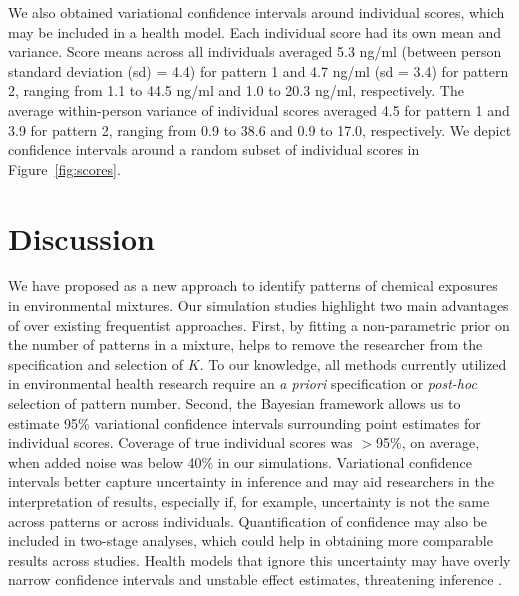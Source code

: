 We also obtained variational confidence intervals around individual scores, which may be included in a health model. Each individual score had its own mean and variance. Score means across all individuals averaged 5.3 ng/ml (between person standard deviation (sd) = 4.4) for pattern 1 and 4.7 ng/ml (sd = 3.4) for pattern 2, ranging from 1.1 to 44.5 ng/ml and 1.0 to 20.3 ng/ml, respectively. The average within-person variance of individual scores averaged 4.5 for pattern 1 and 3.9 for pattern 2, ranging from 0.9 to 38.6 and 0.9 to 17.0, respectively. We depict confidence intervals around a random subset of individual scores in Figure~\ref{fig:scores}.

\section{Discussion}

We have proposed \bnmf as a new approach to identify patterns of chemical exposures in environmental mixtures. Our simulation studies highlight two main advantages of \bnmf over existing frequentist approaches. First, by fitting a non-parametric prior on the number of patterns in a mixture, \bnmf helps to remove the researcher from the specification and selection of $K$. To our knowledge, all methods currently utilized in environmental health research require an \textit{a priori} specification or \textit{post-hoc} selection of pattern number. Second, the Bayesian framework allows us to estimate 95\% variational confidence intervals surrounding point estimates for individual scores. Coverage of true individual scores was $>$95\%, on average, when added noise was below 40\% in our simulations. Variational confidence intervals better capture uncertainty in inference and may aid researchers in the interpretation of results, especially if, for example, uncertainty is not the same across patterns or across individuals. Quantification of confidence may also be included in two-stage analyses, which could help in obtaining more comparable results across studies. Health models that ignore this uncertainty may have overly narrow confidence intervals and unstable effect estimates, threatening inference \cite{mak14_unc}.

